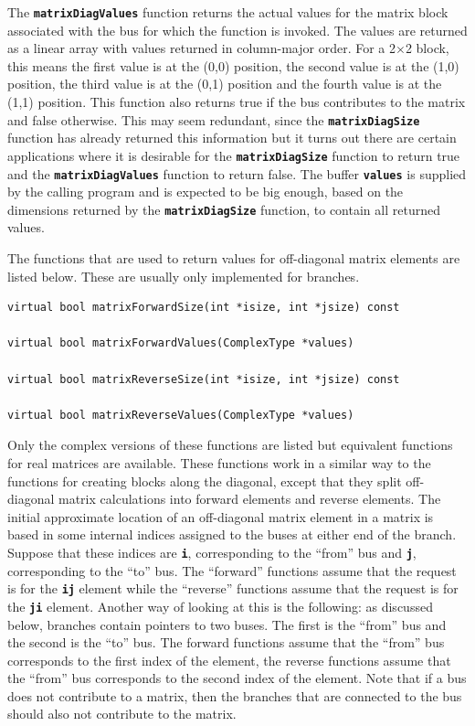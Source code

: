 \documentclass[12pt]{report} %
\begin{document}
The \texttt{\textbf{matrixDiagValues}} function returns the actual values for the matrix block associated with the bus for which the function is invoked. The values are returned as a linear array with values returned in column-major order. For a 2$\mathrm{\times}$2 block, this means the first value is at the (0,0) position, the second value is at the (1,0) position, the third value is at the (0,1) position and the fourth value is at the (1,1) position. This function also returns true if the bus contributes to the matrix and false otherwise. This may seem redundant, since the \texttt{\textbf{matrixDiagSize}} function has already returned this information but it turns out there are certain applications where it is desirable for the \texttt{\textbf{matrixDiagSize}} function to return true and the \texttt{\textbf{matrixDiagValues}} function to return false. The buffer \texttt{\textbf{values}} is supplied by the calling program and is expected to be big enough, based on the dimensions returned by the \texttt{\textbf{matrixDiagSize}} function, to contain all returned values.

The functions that are used to return values for off-diagonal matrix elements are listed below. These are usually only implemented for branches.

{
\color{red}
\begin{Verbatim}[fontseries=b]
virtual bool matrixForwardSize(int *isize, int *jsize) const

virtual bool matrixForwardValues(ComplexType *values)

virtual bool matrixReverseSize(int *isize, int *jsize) const

virtual bool matrixReverseValues(ComplexType *values)
\end{Verbatim}
}

Only the complex versions of these functions are listed but equivalent functions for real matrices are available. These functions work in a similar way to the functions for creating blocks along the diagonal, except that they split off-diagonal matrix calculations into forward elements and reverse elements. The initial approximate location of an off-diagonal matrix element in a matrix is based in some internal indices assigned to the buses at either end of the branch. Suppose that these indices are \texttt{\textbf{i}}, corresponding to the ``from'' bus and \texttt{\textbf{j}}, corresponding to the ``to'' bus. The ``forward'' functions assume that the request is for the \texttt{\textbf{ij}} element while the ``reverse'' functions assume that the request is for the \texttt{\textbf{ji}} element. Another way of looking at this is the following: as discussed below, branches contain pointers to two buses. The first is the ``from'' bus and the second is the ``to'' bus. The forward functions assume that the ``from'' bus corresponds to the first index of the element, the reverse functions assume that the ``from'' bus corresponds to the second index of the element. Note that if a bus does not contribute to a matrix, then the branches that are connected to the bus should also not contribute to the matrix.
\end{document}
